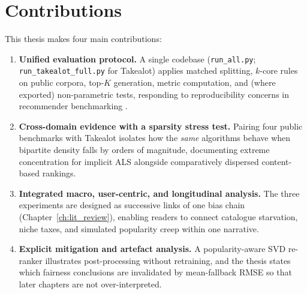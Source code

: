 \section{Contributions}
This thesis makes four main contributions:
\begin{enumerate}
  \item \textbf{Unified evaluation protocol.} A single codebase (\texttt{run\_all.py}; \texttt{run\_takealot\_full.py} for Takealot) applies matched splitting, $k$-core rules on public corpora, top-$K$ generation, metric computation, and (where exported) non-parametric tests, responding to reproducibility concerns in recommender benchmarking \citep{ferrari2019progress}.
  \item \textbf{Cross-domain evidence with a sparsity stress test.} Pairing four public benchmarks with Takealot isolates how the \emph{same} algorithms behave when bipartite density falls by orders of magnitude, documenting extreme concentration for implicit ALS alongside comparatively dispersed content-based rankings.
  \item \textbf{Integrated macro, user-centric, and longitudinal analysis.} The three experiments are designed as successive links of one bias chain (Chapter~\ref{ch:lit_review}), enabling readers to connect catalogue starvation, niche taxes, and simulated popularity creep within one narrative.
  \item \textbf{Explicit mitigation and artefact analysis.} A popularity-aware SVD re-ranker illustrates post-processing without retraining, and the thesis states which fairness conclusions are invalidated by mean-fallback RMSE so that later chapters are not over-interpreted.
\end{enumerate}

